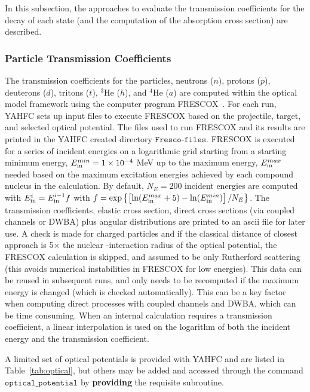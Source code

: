 \documentclass[
10pt,
showpacs,preprintnumbers,footinbib,
amsfonts,amsmath,amssymb,
aps,
prc,twocolumn,groupedaddress,superscriptaddress,
showkeys,
nofootinbib
]{revtex4-1}
\begin{document}
In this subsection, the approaches to evaluate the transmission coefficients for the decay of each state (and the computation of the absorption cross section) are described.

\subsubsection{Particle Transmission Coefficients}

The transmission coefficients for the particles, neutrons ($n$), protons ($p$), deuterons ($d$), tritons ($t$), $^3$He ($h$), and $^4$He ($a$) are computed within the optical model framework using the computer program FRESCOX~\cite{FRESCO}. For each run, YAHFC sets up input files to execute FRESCOX based on the projectile, target, and selected optical potential. The files used to run FRESCOX and its results are printed in the YAHFC created directory ${\texttt{Fresco-files}}$. FRESCOX is executed for a series of incident energies on a logarithmic grid starting from a starting minimum energy, $E_{\rm in}^{min} =1\times 10^{-4}$ MeV up to the maximum energy, $E_{\rm in}^{max}$ needed based on the maximum excitation energies achieved by each compound nucleus in the calculation. By default, $N_E=200$ incident energies are computed with $E_{\rm in}^i = E_{\rm in}^{i-1}f$ with 
$ f = \exp \left \{ \left [ \ln(E_{\rm in}^{max} + 5) - \ln(E_{\rm in}^{min}) \right ]/N_E \right \}$. The transmission coefficients, elastic cross section, direct cross sections (via coupled channels or DWBA) plus angular distributions are printed to an ascii file for later use. A check is made for charged particles and if the classical distance of closest approach is 5$\times$ the nuclear -interaction radius of the optical potential, the FRESCOX calculation is skipped, and assumed to be only Rutherford scattering (this avoids numerical instabilities in FRESCOX for low energies).  This data can be reused in subsequent runs, and only needs to be recomputed if the maximum energy is changed (which is checked automatically). This can be a key factor when computing direct processes with coupled channels and DWBA, which can be time consuming. When an internal calculation requires a transmission coefficient, a linear interpolation is used on the logarithm of both the incident energy and the transmission coefficient. 

A limited set of optical potentials is provided with YAHFC and are listed in Table~\ref{tab:optical}, but others may be added and accessed through the command ${\texttt{optical\_potential}}$ by {\bf providing} the requisite subroutine. 
\end{document}

